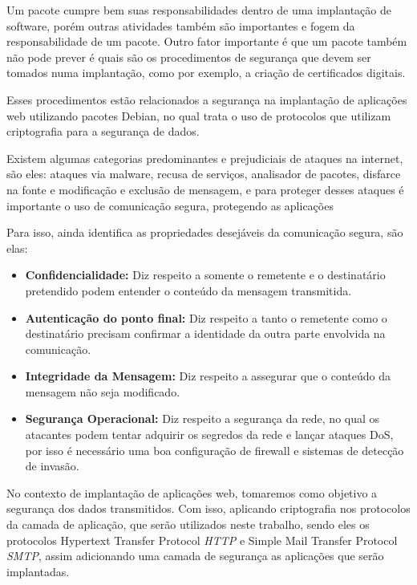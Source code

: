 Um pacote cumpre bem suas responsabilidades dentro de uma implantação de
software, porém outras atividades também são importantes e fogem da responsabilidade 
de um pacote. Outro fator importante é que um pacote também não pode prever é quais são
os procedimentos de segurança que devem ser tomados numa implantação, como por 
exemplo, a criação de certificados digitais. 

Esses procedimentos estão relacionados a segurança na implantação de aplicações web 
utilizando pacotes Debian, no qual trata o uso de protocolos que utilizam criptografia
para  a segurança de dados.

Existem algumas categorias predominantes e prejudiciais de ataques na internet, 
são eles: ataques via malware, recusa de serviços, analisador
de pacotes, disfarce na fonte e modificação e exclusão de mensagem, e para proteger
desses ataques é importante o uso de comunicação segura, protegendo as aplicações 
\cite{kurose2010redes} 

Para isso,  ainda identifica as propriedades 
desejáveis da comunicação segura, são elas:

\begin{itemize}
  \item \textbf{Confidencialidade:} Diz respeito a somente o remetente e o destinatário
  pretendido podem entender o conteúdo da mensagem transmitida.
  \item \textbf{Autenticação do ponto final:} Diz respeito a tanto o remetente como o destinatário
  precisam confirmar a identidade da outra parte envolvida na comunicação.
  \item \textbf{Integridade da Mensagem:} Diz respeito a assegurar que o conteúdo
  da mensagem não seja modificado.
  \item \textbf{Segurança Operacional:} Diz respeito a segurança da rede, no qual
  os atacantes podem tentar adquirir os segredos da rede e lançar ataques DoS,
  por isso é necessário uma boa configuração de firewall e sistemas de detecção
  de invasão.
\end{itemize}

No contexto de implantação de aplicações web, tomaremos como objetivo a segurança
dos dados transmitidos. Com isso, aplicando criptografia nos protocolos da camada
de aplicação, que serão utilizados neste trabalho, sendo eles os protocolos 
Hypertext Transfer Protocol \textit{HTTP} e Simple Mail Transfer Protocol 
\textit{SMTP}, assim adicionando uma camada de segurança as aplicações que serão implantadas.

